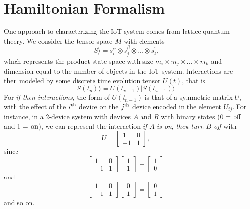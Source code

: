 \documentclass{article}
\def\be{\begin{equation*}}
\def\ee{\end{equation*}}
\begin{document}
\section{Hamiltonian Formalism} %
One approach to characterizing the IoT system comes from lattice quantum theory. We consider the tensor space $M$ with elements 
\be
|S\rangle = s^\alpha_i \otimes s^{\beta}_j \otimes ... \otimes s^{\gamma}_k,
\ee
which represents the product state space with size $m_i \times m_j \times ... \times m_k$ and dimension equal to the number of objects in the IoT system. Interactions are then modeled by some discrete time evolution tensor $U(t)$, that is
\be
|S(t_n)\rangle = U(t_{n-1})|S(t_{n-1})\rangle.
\ee
For \textit{if-then interactions}, the form of $U(t_{n-1})$ is that of a symmetric matrix $U$, with the effect of the $i^{\rm th}$ device on the $j^{\rm th}$ device encoded in the element $U_{ij}$. For instance, in a 2-device system with devices $A$ and $B$ with binary states ($0 = {\rm \, off}$ and $1 = {\rm \, on}$), we can represent the interaction \textit{if $A$ is on, then turn $B$ off} with
\be
U = 
\begin{bmatrix}
1 & 0 \\
-1 & 1
\end{bmatrix},
\ee
since 
\be
\begin{bmatrix}
1 & 0 \\
-1 & 1
\end{bmatrix}
\begin{bmatrix}
1\\
1
\end{bmatrix}
= 
\begin{bmatrix}
1\\
0
\end{bmatrix}
\ee
and 
\be
\begin{bmatrix}
1 & 0 \\
-1 & 1
\end{bmatrix}
\begin{bmatrix}
0\\
1
\end{bmatrix}
= 
\begin{bmatrix}
0\\
1
\end{bmatrix}
\ee
and so on.
\end{document}
